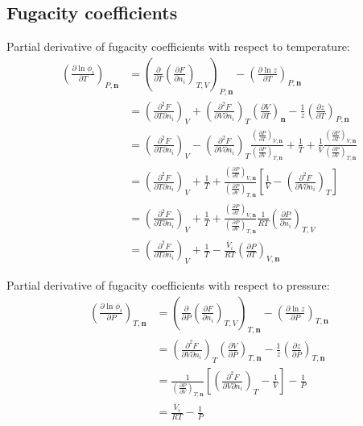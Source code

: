 \documentclass[english]{../thermomemo/thermomemo}
\numberwithin{equation}{section}
\newcommand*{\pd}[2]{\frac{\partial #1}{\partial #2}}
\newcommand*{\pder}[2]{\left(\frac{\partial #1}{\partial #2}\right)}
\newcommand*{\pdcross}[3]{\left(\frac{\partial^2 #1}{\partial #2 \partial #3}\right)}
\begin{document}
\subsection{Fugacity coefficients}
Partial derivative of fugacity coefficients with respect to temperature:
\begin{equation}
\begin{split}
\pder{\ln \phi_i}{T}_{P, \textbf{n}} 
& = \left(\pd{}{T} \pder{F}{n_i}_{T,V} \right)_{P, \textbf{n}} - \pder{\ln z}{T}_{P,\textbf{n}} \\
& = \pdcross{F}{T}{n_i}_V + \pdcross{F}{V}{n_i}_{T} \pder{V}{T}_{\textbf{n}}- \frac{1}{z}\pder{z}{T}_{P, \textbf{n}} \\
& = \pdcross{F}{T}{n_i}_V - \pdcross{F}{V}{n_i}_{T} \frac{\pder{P}{T}_{V,\textbf{n}}}{\pder{P}{V}_{T,\textbf{n}}} + \frac{1}{T} + \frac{1}{V} \frac{\pder{P}{T}_{V,\textbf{n}}}{\pder{P}{V}_{T,\textbf{n}}} \\
& = \pdcross{F}{T}{n_i}_V + \frac{1}{T} + \frac{\pder{P}{T}_{V,\textbf{n}}}{\pder{P}{V}_{T,\textbf{n}}} \left[\frac{1}{V} - \pdcross{F}{V}{n_i}_{T} \right] \\
& = \pdcross{F}{T}{n_i}_V + \frac{1}{T} + \frac{\pder{P}{T}_{V,\textbf{n}}}{\pder{P}{V}_{T,\textbf{n}}} \frac{1}{RT} \pder{P}{n_i}_{T,V} \\
& = \pdcross{F}{T}{n_i}_V + \frac{1}{T} - \frac{\bar{V}_i}{RT}  \pder{P}{T}_{V,\textbf{n}} 
\end{split}
\end{equation}

Partial derivative of fugacity coefficients with respect to pressure:
\begin{equation}
\begin{split}
\pder{\ln \phi_i}{P}_{T, \textbf{n}} 
& = \left(\pd{}{P} \pder{F}{n_i}_{T,V} \right)_{T, \textbf{n}} - \pder{\ln z}{P}_{T,\textbf{n}} \\
& = \pdcross{F}{V}{n_i}_{T} \pder{V}{P}_{T, \textbf{n}} - \frac{1}{z} \pder{z}{P}_{T,\textbf{n}} \\
& = \frac{1}{\pder{P}{V}_{T,\textbf{n}}} \left[ \pdcross{F}{V}{n_i}_{T} - \frac{1}{V} \right] - \frac{1}{P} \\
& = \frac{\bar{V}_i}{RT} - \frac{1}{P} 
\end{split}
\end{equation}
\end{document}
